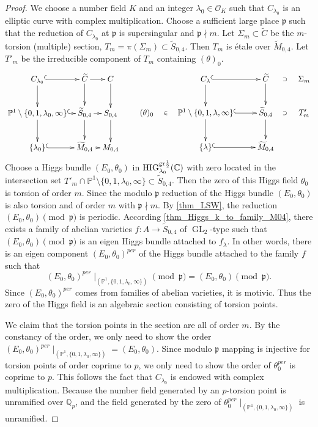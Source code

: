 \documentclass[12pt,twoside]{book}
\theoremstyle{plain}
\theoremstyle{definition}
\theoremstyle{remark}
\newcommand{\frakp}{{\mathfrak p}}
\newcommand{\bC}{{\mathbb C}}
\newcommand{\bP}{{\mathbb P}}
\newcommand{\mO}{{\mathcal O}}
\DeclareMathOperator\GL{GL}
\newcommand{\Qp}{{\mathbb{Q}_p}}
\numberwithin{equation}{section}
\begin{document}
\begin{proof}
We choose a number field $K$ and an integer $\lambda_0\in \mO_K$ such that $C_{\lambda_0}$ is an elliptic curve with complex multiplication. Choose a sufficient large place $\frakp$ such that the reduction of $C_{\lambda_0}$ at $\frakp$ is supersingular and $\frakp\nmid m$. Let $\Sigma_m\subset \widetilde{C}$ be the $m$-torsion (multiple) section, $T_m=\pi(\Sigma_m)\subset \widetilde{S}_{0,4}$.
Then $T_m$ is \'etale over $\widetilde{M}_{0,4}$. Let $T'_m$ be the irreducible component of $T_m$ containing $(\theta)_0$.
\begin{equation*}
\xymatrix@C=2mm{
C_{\lambda_0} \ar@{^(->}[r] \ar[d] & \widetilde{C}\ar[r] \ar[d] & C \ar[d] \\
\bP^1\setminus\{0,1,\lambda_0,\infty\} \ar[d] \ar@{^(->}[r] & \widetilde{S}_{0,4}\ar[r] \ar[d]& S_{0,4}\ar[d]\\
\{\lambda_0\} \ar@{^(->}[r] & \widetilde{M}_{0,4} \ar[r] & M_{0,4}
}
\qquad
\xymatrix{
& C_\lambda \ar@{^(->}[r] \ar[d] & \widetilde{C} \ar@{}[r]|\supset \ar[d] & \Sigma_m \\
(\theta)_0 \ar@{}[r]|-\in & \bP^1\setminus\{0,1,\lambda,\infty\} \ar[d] \ar@{^(->}[r] & \widetilde{S}_{0,4} \ar[d] \ar@{}[r]|\supset & T'_m \\
& \{\lambda\} \ar@{^(->}[r] & \widetilde{M}_{0,4}\\
}
\end{equation*}
Choose a Higgs bundle $(E_0,\theta_0)$ in $\mathrm{HIG}_{\lambda_0}^{{\rm gr}{1\over2}}(\bC)$ with zero located in the intersection set $T'_m\cap \bP^1\setminus\{0,1,\lambda_0,\infty\} \subset \widetilde{S}_{0,4}$. Then the zero of this Higgs field $\theta_0$ is torsion of order $m$. Since the modulo $\frakp$ reduction of the Higgs bundle $(E_0,\theta_0)$ is also torsion and of order $m$ with $\frakp\nmid m$. By \autoref{thm_LSW}, the reduction $(E_0,\theta_0)\pmod{\frakp}$ is periodic. According \autoref{thm_Higgs_k_to_family_M04}, there exists a family of abelian varieties $f\colon A\to \widetilde{S}_{0,4}$ of $\GL_2$-type such that $(E_0,\theta_0)\pmod{\frakp}$ is an eigen Higgs bundle attached to $f_{\lambda}$. In other words, there is an eigen component $(E_0,\theta_0)^{per}$ of the Higgs bundle attached to the family $f$ such that \[(E_0,\theta_0)^{per}\mid_{(\bP^1,\{0,1,\lambda_0,\infty\})} \pmod{\frakp} = (E_0,\theta_0) \pmod{\frakp}.\]
Since $(E_0,\theta_0)^{per}$ comes from families of abelian varieties, it is motivic. Thus the zero of the Higgs field is an algebraic section consisting of torsion points.

We claim that the torsion points in the section are all of order $m$. By the constancy of the order, we only need to show the order $(E_0,\theta_0)^{per}\mid_{(\bP^1,\{0,1,\lambda_0,\infty\})}=(E_0,\theta_0)$. Since modulo $\frakp$ mapping is injective for torsion points of order coprime to $p$, we only need to show the order of $\theta_0^{per}$ is coprime to $p$. This follows the fact that $C_{\lambda_0}$ is endowed with complex multiplication. Because the number field generated by an $p$-torsion point is unramified over $\Qp$, and the field generated by the zero of $\theta_0^{per}\mid_{(\bP^1,\{0,1,\lambda_0,\infty\})}$ is unramified.


\end{proof}
\end{document}
